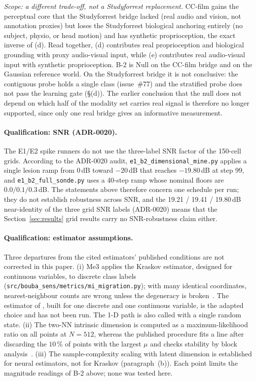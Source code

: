 \documentclass{article}
\begin{document}
\emph{Scope: a different trade-off, not a Studyforrest replacement.}
CC-film gains the perceptual core that the Studyforrest bridge lacked
(real audio and vision, not annotation proxies) but loses the
Studyforrest biological anchoring entirely (no subject, physio, or
head motion) and has synthetic proprioception, the exact inverse of
(d). Read together, (d) contributes real proprioception and biological
grounding with proxy audio-visual input, while (e) contributes real
audio-visual input with synthetic proprioception. B-2 is Null on the
CC-film bridge and on the Gaussian reference world. On the
Studyforrest bridge it is not conclusive: the contiguous probe holds
a single class (issue~\#77) and the stratified probe does not pass the
learning gate (\S(d)). The earlier conclusion that the null does not
depend on which half of the modality set carries real signal is
therefore no longer supported, since only one real bridge gives an
informative measurement.

\paragraph{Qualification: SNR (ADR-0020).} The E1/E2 spike runners do
not use the three-label SNR factor of the 150-cell grids. According to
the ADR-0020 audit, \texttt{e1\_b2\_dimensional\_mine.py} applies a
single lesion ramp from $0$\,dB toward $-20$\,dB that reaches
$-19.80$\,dB at step 99, and \texttt{e1\_b2\_full\_sonde.py} uses a
40-step ramp whose nominal floors are $0.0 / 0.1 / 0.3$\,dB. The
statements above therefore concern one schedule per run; they do not
establish robustness across SNR, and the 19.21 / 19.41 / 19.80\,dB
near-identity of the three grid SNR labels (ADR-0020) means that the
Section~\ref{sec:results} grid results carry no SNR-robustness claim
either.

\paragraph{Qualification: estimator assumptions.} Three departures
from the cited estimators' published conditions are not corrected in
this paper. (i) Me3 applies the Kraskov estimator, designed for
continuous variables, to discrete class labels
(\texttt{src/bouba\_sens/metrics/mi\_migration.py}); with many
identical coordinates, nearest-neighbour counts are wrong unless the
degeneracy is broken~\citep[p.~6]{kraskov2004estimating}. The
estimator of \citet{ross2014mutual}, built for one discrete and one
continuous variable, is the adapted choice and has not been run. The
1-D path is also called with a single random state. (ii) The
two-NN intrinsic dimension is computed as a maximum-likelihood ratio
on all points at $N = 512$, whereas the published procedure fits a
line after discarding the $10\,\%$ of points with the largest
$\mu$ and checks stability by block analysis~\citep[p.~3--6]{facco2017estimating}.
(iii) The sample-complexity scaling with latent dimension is
established for neural estimators, not for Kraskov (paragraph~(b)).
Each point limits the magnitude readings of B-2 above; none was
tested here.
\end{document}
